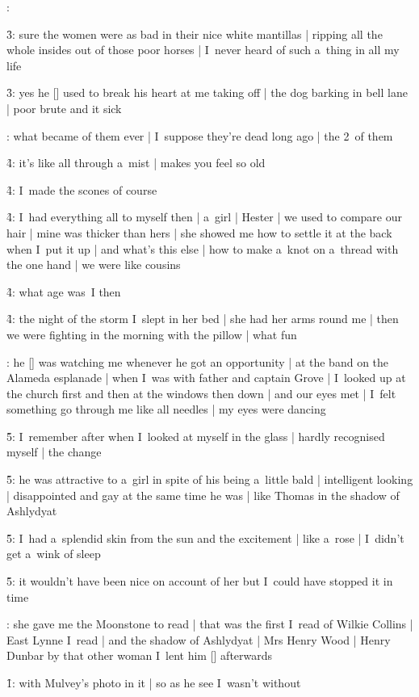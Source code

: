 \M*:

\f3:
sure the women were as bad in their nice white mantillas |
ripping all the whole insides out of those poor horses |
I~never heard of such a~thing in all my life

\f3:
yes he [\dog] used to break his heart at me taking off |
the dog barking in bell lane |
poor brute and it sick

:
what became of them ever |
I~suppose they're dead long ago |
the 2~of them

\f4:
it's like all through a~mist |
makes you feel so old

\f4:
I~made the scones of course

\f4:
I~had everything all to myself then |
a~girl |
Hester |
we used to compare our hair |
mine was thicker than hers |
she showed me how to settle it at the back when I~put it up |
and what's this else |
how to make a~knot on a~thread with the one hand |
we were like cousins

\f4:
what age was~I then

\f4:
the night of the storm I~slept in her bed |
she had her arms round me |
then we were fighting in the morning with the pillow |
what fun

:
he [\wogger] was watching me whenever he got an opportunity |
at the band on the Alameda esplanade |
when I~was with father and captain Grove |
I~looked up at the church first and then at the windows then down |
and our eyes met |
I~felt something go through me like all needles |
my eyes were dancing

\f5:
I~remember after when I~looked at myself in the glass |
hardly recognised myself |
the change

\f5:
he was attractive to a~girl in spite of his being a~little bald |
intelligent looking |
disappointed and gay at the same time he was |
like Thomas in the shadow of Ashlydyat

\f5:
I~had a~splendid skin from the sun and the excitement |
like a~rose |
I~didn't get a~wink of sleep

\f5:
it wouldn't have been nice on account of her but I~could have stopped it in time

:
she gave me the Moonstone to read |
that was the first I~read of Wilkie Collins |
East Lynne I~read |
and the shadow of Ashlydyat |
Mrs Henry Wood |
Henry Dunbar by that other woman I~lent him [\wogger] afterwards

\f1:
with Mulvey's photo in it |
so as he see I~wasn't without

